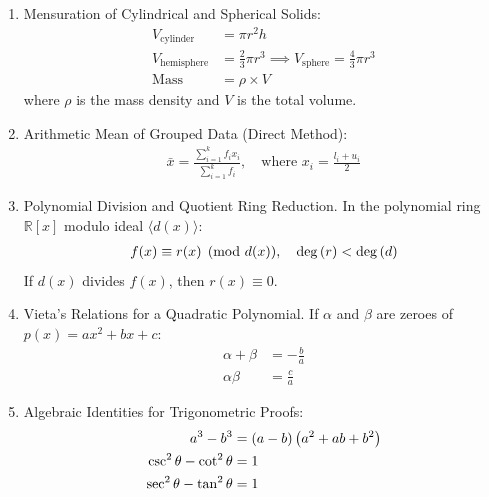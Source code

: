 \begin{enumerate}[label=\thesubsection.\arabic*, ref=\thesubsection.\theenumi]
	\item Mensuration of Cylindrical and Spherical Solids:
	\begin{align}
		V_{\text{cylinder}} &= \pi r^2 h \label{eq:CBSE10-2019-vol_cylinder} \\
		V_{\text{hemisphere}} &= \frac{2}{3}\pi r^3 \implies V_{\text{sphere}} = \frac{4}{3}\pi r^3 \label{eq:CBSE10-2019-vol_sphere} \\
		\text{Mass} &= \rho \times V \label{eq:CBSE10-2019-mass_density}
	\end{align}
	where $\rho$ is the mass density and $V$ is the total volume.
	
	\item Arithmetic Mean of Grouped Data (Direct Method):
	\begin{align}
		\bar{x} = \frac{\sum_{i=1}^k f_i x_i}{\sum_{i=1}^k f_i}, \quad \text{where } x_i = \frac{l_i + u_i}{2} \label{eq:CBSE10-2019-mean}
	\end{align}
	
	\item Polynomial Division and Quotient Ring Reduction.
	In the polynomial ring $\mathbb{R}[x]$ modulo ideal $\langle d(x) \rangle$:
	\begin{align}
		f(x) \equiv r(x) \pmod{d(x)}, \quad \deg\left(r\right) < \deg\left(d\right) \label{eq:CBSE10-2019-poly_mod}
	\end{align}
	If $d(x)$ divides $f(x)$, then $r(x) \equiv 0$.
	
	\item Vieta's Relations for a Quadratic Polynomial.
	If $\alpha$ and $\beta$ are zeroes of $p(x) = ax^2 + bx + c$:
	\begin{align}
		\alpha + \beta &= -\frac{b}{a} \label{eq:CBSE10-2019-vieta_sum} \\
		\alpha \beta &= \frac{c}{a} \label{eq:CBSE10-2019-vieta_prod}
	\end{align}
	
	\item Algebraic Identities for Trigonometric Proofs:
	\begin{align}
		a^3 - b^3 &= \left(a - b\right)\left(a^2 + ab + b^2\right) \label{eq:CBSE10-2019-cubic_diff} \\
		\csc^2\theta - \cot^2\theta &= 1 \label{eq:CBSE10-2019-csc_cot_id} \\
		\sec^2\theta - \tan^2\theta &= 1 \label{eq:CBSE10-2019-sec_tan_id}
	\end{align}
	
	
\end{enumerate}